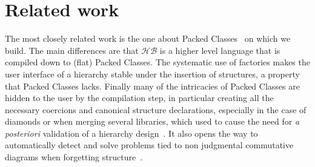 \documentclass[a4paper,UKenglish,cleveref, autoref]{lipics-v2019}
\newcommand{\HB}{\ensuremath{\mathcal{HB}}}
\newcommand{\mixin}{mixin}
\newcommand{\factories}{factories}
\theoremstyle{implem}
\theoremstyle{implem}
\theoremstyle{command}
\begin{document}
{{%
%
%
%
%

\section{Related work}
The most closely related work is the one about Packed Classes~\cite{DBLP:conf/tphol/GarillotGMR09} on which we
build. The main differences are that \HB{} is a higher level language
that is compiled down to (flat) Packed Classes. The systematic use of
\factories{} makes the user interface of a hierarchy stable under the insertion of
structures, a property that Packed Classes lacks.
Finally many of the intricacies of Packed Classes are hidden to the user by
the compilation step, in particular creating all the necessary coercions and canonical structure declarations,
especially in the case of diamonds or when merging several libraries, which used to cause the need for \textit{a posteriori}
validation of a hierarchy design~\cite{KSdraft}. It also opens the way
to automatically detect and solve problems tied to non judgmental commutative diagrams when forgetting
structure~\cite{affeldt:hal-02463336}.


}}
\end{document}
